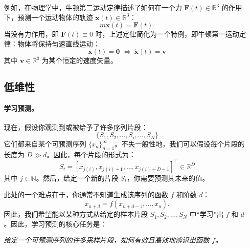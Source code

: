 \documentclass[../../book-main.tex]{subfiles}
\begin{document}
\begin{example}
    例如，在物理学中，牛顿第二运动定律描述了如何在一个力 $\boldsymbol{F}(t) \in \mathbb{R}^3$ 的作用下，预测一个运动物体的轨迹 $\boldsymbol{x}(t) \in \mathbb{R}^3$：
\begin{equation}
    m\ddot{\boldsymbol{x}}(t) = \boldsymbol{F}(t).
\end{equation}
    当没有力作用，即 $\boldsymbol{F}(t) \equiv 0$ 时，上述定律简化为一个特例，即牛顿第一运动定律：物体将保持匀速直线运动：
\begin{equation}
   \ddot{\boldsymbol{x}}(t) = \boldsymbol{0} \; \Leftrightarrow \; \dot{\boldsymbol{x}}(t) = \boldsymbol{v}
\end{equation}
    其中 $\boldsymbol{v} \in \mathbb{R}^3$ 为某个恒定的速度矢量。
\end{example}




\subsection{低维性}\label{sec:intro-low-dimensionality}
\paragraph{学习预测。}
现在，假设你观测到或被给予了许多序列片段：
\begin{equation}
    \{S_1, S_2, \ldots, S_i, \ldots, S_N\}
\end{equation}
它们都来自某个可预测序列 $\{x_n\}_{n=1}^\infty$。不失一般性地，我们可以假设每个片段的长度为 $D \gg d$。因此，每个片段的形式为：
\begin{equation}
    S_i = [x_{j(i)}, x_{j(i)+1}, \ldots, x_{j(i)+D-1}]^\top \in \mathbb{R}^D
\end{equation}
其中 $j \in \mathbb{N}$。然后，给定一个新的片段 $S_t$，你需要预测其未来的值。

此处的一个难点在于，你通常不知道生成该序列的函数 $f$ 和阶数 $d$：
\begin{equation}
    x_{n+d} = f(x_{n+d-1}, \ldots,  x_{n}).
\label{eqn:sequence-order-d}
\end{equation}
因此，我们希望能以某种方式从给定的样本片段 $S_1, S_2, \ldots, S_N$ 中“学习”出 $f$ 和 $d$。因此，学习预测的核心任务是：
\begin{center}
{\em 给定一个可预测序列的许多采样片段，如何有效且高效地辨识出函数 $f$。}
\end{center}
\end{document}
